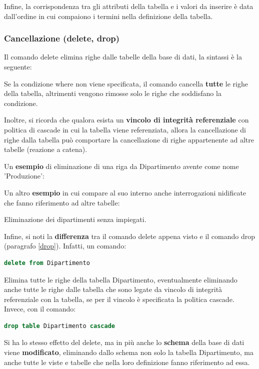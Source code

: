 \documentclass[a4paper]{article}
\begin{document}
	\noindent
	Infine, la corrispondenza tra gli attributi della tabella e i valori da inserire è data dall'ordine in cui compaiono i termini nella definizione della tabella.\newpage
	
	\subsubsection{Cancellazione (\textsf{delete}, \textsf{drop})}
	
	Il comando \textsf{delete} elimina righe dalle tabelle della base di dati, la sintassi è la seguente:
	
	Se la condizione \textsf{where} non viene specificata, il comando cancella \textbf{tutte} le righe della tabella, altrimenti vengono rimosse solo le righe che soddisfano la condizione.
	
	Inoltre, si ricorda che qualora esista un \textbf{vincolo di integrità referenziale} con politica di \textsf{cascade} in cui la tabella viene referenziata, allora la cancellazione di righe dalla tabella può comportare la cancellazione di righe appartenente ad altre tabelle (reazione a catena).\newline
	
	\noindent
	Un \textcolor{Green4}{\textbf{esempio}} di eliminazione di una riga da Dipartimento avente come nome \textsf{'Produzione'}:
	
	Un altro \textcolor{Green4}{\textbf{esempio}} in cui compare al suo interno anche interrogazioni nidificate che fanno riferimento ad altre tabelle:
	
	Eliminazione dei dipartimenti senza impiegati.\newline
	
	\noindent
	Infine, si noti la \textbf{differenza} tra il comando \textsf{delete} appena visto e il comando \textsf{drop} (paragrafo \ref{drop}). Infatti, un comando:
\begin{lstlisting}[language=SQL]
delete from Dipartimento\end{lstlisting}
	Elimina tutte le righe della tabella Dipartimento, eventualmente eliminando anche tutte le righe dalle tabella che sono legate da vincolo di integrità referenziale con la tabella, se per il vincolo è specificata la politica \textsf{cascade}.\newline
	Invece, con il comando:
\begin{lstlisting}[language=SQL]
drop table Dipartimento cascade\end{lstlisting}
	Si ha lo stesso effetto del \textsf{delete}, ma in più anche lo \textbf{schema} della base di dati viene \textbf{modificato}, eliminando dallo schema non solo la tabella Dipartimento, ma anche tutte le viste e tabelle che nella loro definizione fanno riferimento ad essa.\newpage
	
\end{document}
